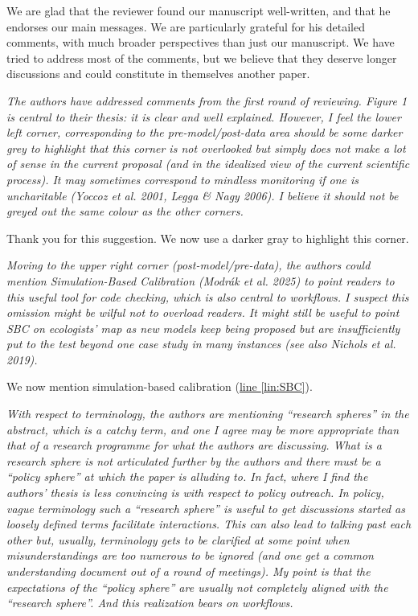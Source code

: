 \documentclass[11pt,letter]{article}
\begin{document}
We are glad that the reviewer found our manuscript well-written, and that he endorses our main messages. We are particularly grateful for his detailed comments, with much broader perspectives than just our manuscript. We have tried to address most of the comments, but we believe that they deserve longer discussions and could constitute in themselves another paper.

\begin{mybox}
\emph{The authors have addressed comments from the first round of reviewing. Figure 1 is central to their thesis: it is clear and well explained. However, I feel the lower left corner, corresponding to the pre-model/post-data area should be some darker grey to highlight that this corner is not overlooked but simply does not make a lot of sense in the current proposal (and in the idealized view of the current scientific process). It may sometimes correspond to mindless monitoring if one is uncharitable (Yoccoz et al. 2001, Legga \& Nagy 2006). I believe it should not be greyed out the same colour as the other corners.}  
\end{mybox}

Thank you for this suggestion. We now use a darker gray to highlight this corner.

\begin{mybox}
\emph{Moving to the upper right corner (post-model/pre-data), the authors could mention
Simulation-Based Calibration (Modrák et al. 2025) to point readers to this useful tool for code
checking, which is also central to workflows. I suspect this omission might be wilful not to
overload readers. It might still be useful to point SBC on ecologists’ map as new models keep
being proposed but are insufficiently put to the test beyond one case study in many instances
(see also Nichols et al. 2019).}  
\end{mybox}

We now mention simulation-based calibration (\href{file:forecastflows_r2\#lintarget:SBC}{line \ref*{lin:SBC}}).

\begin{mybox}
\emph{With respect to terminology, the authors are mentioning “research spheres” in the abstract,
which is a catchy term, and one I agree may be more appropriate than that of a research
programme for what the authors are discussing. What is a research sphere is not articulated
further by the authors and there must be a “policy sphere” at which the paper is alluding to. In
fact, where I find the authors’ thesis is less convincing is with respect to policy outreach. In
policy, vague terminology such a “research sphere” is useful to get discussions started as
loosely defined terms facilitate interactions. This can also lead to talking past each other but,
usually, terminology gets to be clarified at some point when misunderstandings are too
numerous to be ignored (and one get a common understanding document out of a round of
meetings). My point is that the expectations of the “policy sphere” are usually not completely
aligned with the “research sphere”. And this realization bears on workflows.}  
\end{mybox}
\end{document}
